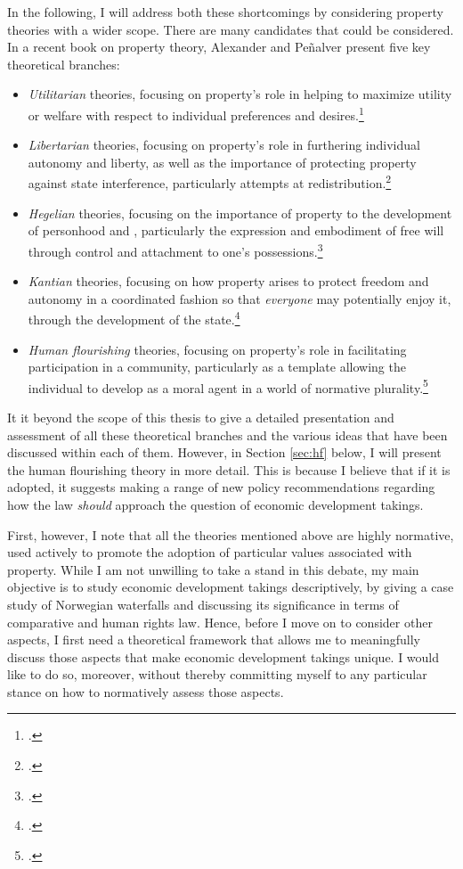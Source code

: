 In the following, I will address both these shortcomings by considering property theories with a wider scope. There are many candidates that could be considered. In a recent book on property theory, Alexander and Pe\~{n}alver present five key theoretical branches: 
\begin{itemize}
\item {\it Utilitarian} theories, focusing on property's role in helping to maximize utility or welfare with respect to individual preferences and desires.\footnote{\cite[Chapter 1]{alexander10}.} 
\item {\it Libertarian} theories, focusing on property's role in furthering individual autonomy and liberty, as well as the importance of protecting property against state interference, particularly attempts at redistribution.\footnote{\cite[Chapter 2]{alexander10}.} 
\item {\it Hegelian} theories, focusing on the importance of property to the development of personhood and , particularly the expression and embodiment of free will through control and attachment to one's possessions.\footnote{\cite[Chapter 3]{alexander10}.}
\item {\it Kantian} theories, focusing on how property arises to protect freedom and autonomy in a coordinated fashion so that {\it everyone} may potentially enjoy it, through the development of the state.\footnote{\cite[Chapter 4]{alexander10}.}
\item {\it  Human flourishing} theories, focusing on property's role in facilitating participation in a community, particularly as a template allowing the individual to develop as a moral agent in a world of normative plurality.\footnote{\cite[Chapter 5]{alexander10}.}
\end{itemize}

It it beyond the scope of this thesis to give a detailed presentation and assessment of all these theoretical branches and the various ideas that have been discussed within each of them. However, in Section \ref{sec:hf} below, I will present the human flourishing theory in more detail. This is because I believe that if it is adopted, it suggests making a range of new policy recommendations regarding how the law {\it should} approach the question of economic development takings. 

First, however, I note that all the theories mentioned above are highly normative, used actively to promote the adoption of particular values associated with property. While I am not unwilling to take a stand in this debate, my main objective is to study economic development takings descriptively, by giving a case study of Norwegian waterfalls and discussing its significance in terms of comparative and human rights law. Hence, before I move on to consider other aspects, I first need a theoretical framework that allows me to meaningfully discuss those aspects that make economic development takings unique. I would like to do so, moreover, without thereby committing myself to any particular stance on how to normatively assess those aspects. 

